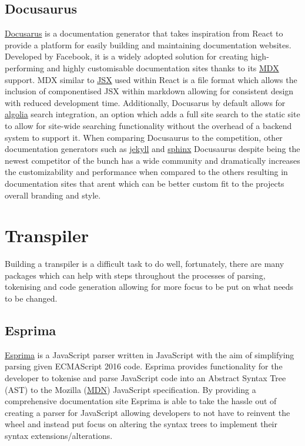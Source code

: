 \documentclass{l4proj}
\begin{document}
\subsection{Docusaurus}
\href{https://docusaurus.io/}{Docusarus} is a documentation generator that takes inspiration from React to provide a platform for easily building and maintaining documentation websites. Developed by Facebook, it is a widely adopted solution for creating high-performing and highly customisable documentation sites thanks to its \href{https://mdxjs.com/}{MDX} support. MDX similar to \href{https://reactjs.org/docs/introducing-jsx.html}{JSX} used within React is a file format which allows the inclusion of componentised JSX within markdown allowing for consistent design with reduced development time. Additionally, Docusarus by default allows for \href{https://www.algolia.com/}{algolia} search integration, an option which adds a full site search to the static site to allow for site-wide searching functionality without the overhead of a backend system to support it. When comparing Docusaurus to the competition, other documentation generators such as \href{https://jekyllrb.com/}{jekyll} and \href{https://www.sphinx-doc.org/en/master/}{sphinx} Docusaurus despite being the newest competitor of the bunch has a wide community and dramatically increases the customizability and performance when compared to the others resulting in documentation sites that arent which can be better custom fit to the projects overall branding and style.


\section{Transpiler}

Building a transpiler is a difficult task to do well, fortunately, there are many packages which can help with steps throughout the processes of parsing, tokenising and code generation allowing for more focus to be put on what needs to be changed.

\subsection{Esprima }
\href{https://esprima.org/}{Esprima} is a JavaScript parser written in JavaScript with the aim of simplifying parsing given ECMAScript 2016 code. Esprima provides functionality for the developer to tokenise and parse JavaScript code into an Abstract Syntax Tree (AST) to the Mozilla (\href{https://developer.mozilla.org/en-US/}{MDN}) JavaScript specification. By providing a comprehensive documentation site Esprima is able to take the hassle out of creating a parser for JavaScript allowing developers to not have to reinvent the wheel and instead put focus on altering the syntax trees to implement their syntax extensions/alterations. 
\end{document}
